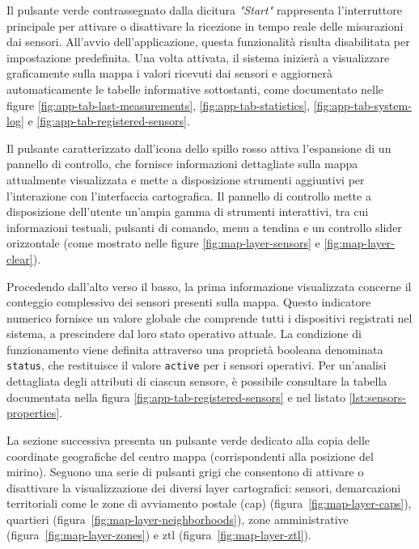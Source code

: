 Il pulsante verde contrassegnato dalla dicitura \textit{"Start"} rappresenta l'interruttore principale
per attivare o disattivare la ricezione in tempo reale delle misurazioni dai sensori.
All'avvio dell'applicazione, questa funzionalità risulta disabilitata per impostazione predefinita.
Una volta attivata, il sistema inizierà a visualizzare graficamente sulla mappa
i valori ricevuti dai sensori e aggiornerà automaticamente le tabelle informative sottostanti,
come documentato nelle figure \ref{fig:app-tab-last-measurements}, \ref{fig:app-tab-statistics},
\ref{fig:app-tab-system-log} e \ref{fig:app-tab-registered-sensors}.

Il pulsante caratterizzato dall'icona dello spillo rosso attiva l'espansione di un pannello di controllo,
che fornisce informazioni dettagliate sulla mappa attualmente visualizzata e mette a disposizione strumenti
aggiuntivi per l'interazione con l'interfaccia cartografica.
Il pannello di controllo mette a disposizione dell'utente un'ampia gamma di strumenti interattivi, tra cui
informazioni testuali, pulsanti di comando, menu a tendina e un controllo slider orizzontale
(come mostrato nelle figure \ref{fig:map-layer-sensors} e \ref{fig:map-layer-clear}).

Procedendo dall'alto verso il basso, la prima informazione visualizzata concerne il conteggio complessivo
dei sensori presenti sulla mappa. Questo indicatore numerico fornisce un valore globale che comprende tutti
i dispositivi registrati nel sistema, a prescindere dal loro stato operativo attuale. La condizione di funzionamento
viene definita attraverso una proprietà booleana denominata \texttt{status}, che restituisce il valore \texttt{active}
per i sensori operativi. Per un'analisi dettagliata degli attributi di ciascun sensore, è possibile consultare
la tabella documentata nella figura \ref{fig:app-tab-registered-sensors} e nel listato \ref{lst:sensors-properties}.

La sezione successiva presenta un pulsante verde dedicato alla copia delle coordinate geografiche del centro mappa
(corrispondenti alla posizione del mirino). Seguono una serie di pulsanti grigi che consentono
di attivare o disattivare la visualizzazione dei diversi layer cartografici: sensori, demarcazioni territoriali
come le zone di avviamento postale (\acrshort{cap}) (figura~\ref{fig:map-layer-caps}),
quartieri (figura~\ref{fig:map-layer-neighborhoods}),
zone amministrative (figura~\ref{fig:map-layer-zones}) e \acrshort{ztl} (figura~\ref{fig:map-layer-ztl}).

